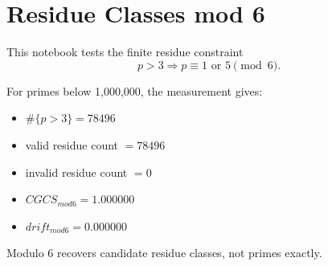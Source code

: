 \section*{Residue Classes mod 6}

This notebook tests the finite residue constraint
\[
p > 3 \Rightarrow p \equiv 1 \text{ or } 5 \pmod{6}.
\]

For primes below 1,000,000, the measurement gives:
\begin{itemize}
  \item $\#\{p>3\} = 78496$
  \item valid residue count $= 78496$
  \item invalid residue count $= 0$
  \item $CGCS_{mod6} = 1.000000$
  \item $drift_{mod6} = 0.000000$
\end{itemize}

Modulo 6 recovers candidate residue classes, not primes exactly.
